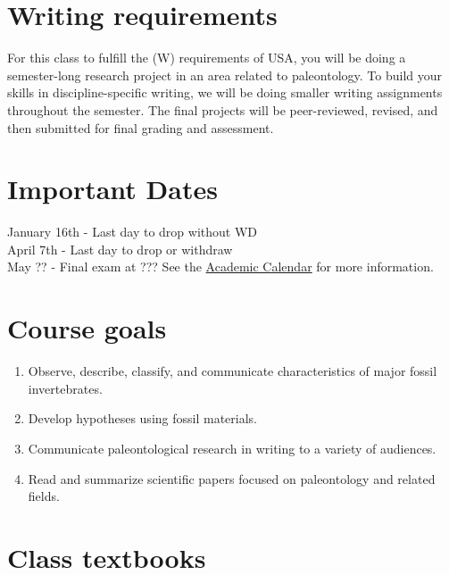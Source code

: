 \documentclass[11pt,]{article}
\begin{document}
\hypertarget{writing-requirements}{%
\section{Writing requirements}\label{writing-requirements}}

For this class to fulfill the (W) requirements of USA, you will be doing
a semester-long research project in an area related to paleontology. To
build your skills in discipline-specific writing, we will be doing
smaller writing assignments throughout the semester. The final projects
will be peer-reviewed, revised, and then submitted for final grading and
assessment.

\hypertarget{important-dates}{%
\section{Important Dates}\label{important-dates}}

January 16th - Last day to drop without WD\\
April 7th - Last day to drop or withdraw\\
May ?? - Final exam at ??? See the
\href{https://www.southalabama.edu/academiccalendar/}{Academic Calendar}
for more information.

\newpage

\hypertarget{course-goals}{%
\section{Course goals}\label{course-goals}}

\begin{enumerate}
\def\labelenumi{\arabic{enumi}.}
\item
  Observe, describe, classify, and communicate characteristics of major
  fossil invertebrates.
\item
  Develop hypotheses using fossil materials.
\item
  Communicate paleontological research in writing to a variety of
  audiences.
\item
  Read and summarize scientific papers focused on paleontology and
  related fields.
\end{enumerate}

\hypertarget{class-textbooks}{%
\section{Class textbooks}\label{class-textbooks}}
\end{document}
